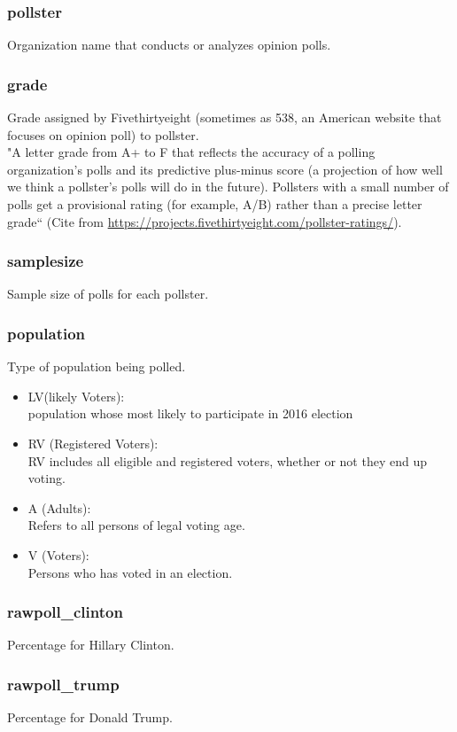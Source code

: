 \documentclass[12pt]{article}
\begin{document}
	\subsubsection{pollster}
	Organization name that conducts or analyzes opinion polls.
	\subsubsection{grade}
	Grade assigned by Fivethirtyeight (sometimes as 538, an American website that focuses on opinion poll) to pollster.\\
	"A letter grade from A+ to F that reflects the accuracy of a polling organization's polls and its predictive plus-minus score (a projection of how well we think a pollster's polls will do in the future). Pollsters with a small number of polls get a provisional rating (for example, A/B) rather than a precise letter grade“ (Cite from \url{ https://projects.fivethirtyeight.com/pollster-ratings/}).
	\subsubsection{samplesize}
	Sample size of polls for each pollster.
	\subsubsection{population}
	Type of population being polled.
	
	\begin{itemize}
		\item LV(likely Voters): \\population whose most likely to participate in 2016 election
		\item RV (Registered Voters): \\RV includes all eligible and registered voters, whether or not they end up voting.
		\item A (Adults): \\Refers to all persons of legal voting age.
		\item V (Voters): \\Persons who has voted in an election.
	\end{itemize}
	
	\subsubsection{rawpoll\_clinton}
	Percentage for Hillary Clinton.
	\subsubsection{rawpoll\_trump}
	Percentage for Donald Trump.
\end{document}
